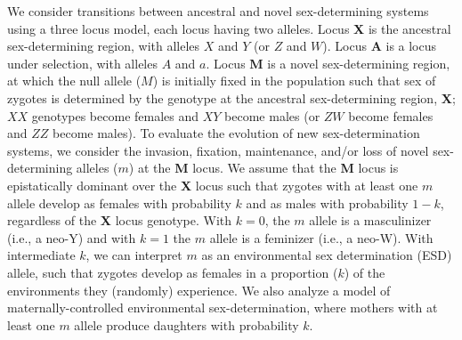 \documentclass[12pt]{article}
\begin{document}
We consider transitions between ancestral and novel sex-determining systems using a three locus model, each locus having two alleles. 
Locus \textbf{X} is the ancestral sex-determining region, with alleles $X$ and $Y$ (or $Z$ and $W$).
Locus \textbf{A} is a locus under selection, with alleles $A$ and $a$.
Locus \textbf{M} is a novel sex-determining region, at which the null allele ($M$) is initially fixed in the population such that sex of zygotes is determined by the genotype at the ancestral sex-determining region, \textbf{X}; $XX$ genotypes become females and $XY$ become males (or $ZW$ become females and $ZZ$ become males). 
To evaluate the evolution of new sex-determination systems, we consider the invasion, fixation, maintenance, and/or loss of novel sex-determining alleles ($m$) at the \textbf{M} locus. 
We assume that the \textbf{M} locus is epistatically dominant over the \textbf{X} locus such that zygotes with at least one $m$ allele develop as females with probability $k$ and as males with probability $1-k$, regardless of the \textbf{X} locus genotype.
With $k=0$, the $m$ allele is a masculinizer (i.e., a neo-Y) and with $k=1$ the $m$ allele is a feminizer (i.e., a neo-W).
With intermediate $k$, we can interpret $m$ as an environmental sex determination (ESD) allele, such that zygotes develop as females in a proportion ($k$) of the environments they (randomly) experience. 
We also analyze a model of maternally-controlled environmental sex-determination, where mothers with at least one $m$ allele produce daughters with probability $k$. 
\end{document}
